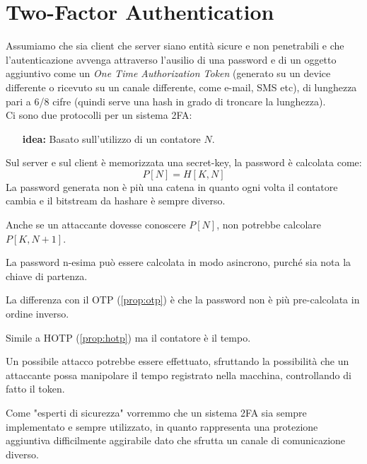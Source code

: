 \section{Two-Factor Authentication}
Assumiamo che sia client che server siano entità sicure e non penetrabili e che l'autenticazione avvenga attraverso l'ausilio di una password e di un oggetto aggiuntivo come un \textit{One Time Authorization Token} (generato su un device differente o ricevuto su un canale differente, come e-mail, SMS etc), di lunghezza pari a 6/8 cifre (quindi serve una hash in grado di troncare la lunghezza).\\
Ci sono due protocolli per un sistema 2FA:
\begin{proposition}\label{prop:hotp}
\begin{itemize}
    \item [\textbf{idea:}]Basato sull'utilizzo di un contatore $N$.
\end{itemize}
Sul server e sul client è memorizzata una secret-key, la password è calcolata come: 
\begin{equation*}
    P[N]=H[K,N]
\end{equation*}
La password generata non è più una catena in quanto ogni volta il contatore cambia e il bitstream da hashare è sempre diverso.
\end{proposition}
\begin{remark}
Anche se un attaccante dovesse conoscere $P[N]$, non potrebbe calcolare $P[K,N+1]$.
\end{remark}
\begin{remark}
La password n-esima può essere calcolata in modo asincrono, purché sia nota la chiave di partenza.
\end{remark}
\begin{remark}
La differenza con il OTP (\cref{prop:otp}) è che la password non è più pre-calcolata in ordine inverso. 
\end{remark}
\begin{proposition}\label{ prop:totp}
Simile a HOTP (\cref{prop:hotp}) ma il contatore è il tempo.
\end{proposition}
\begin{remark}
Un possibile attacco potrebbe essere effettuato, sfruttando la possibilità che un attaccante possa manipolare il tempo registrato nella macchina, controllando di fatto il token.
\end{remark}
\begin{corollary}
Come "esperti di sicurezza" vorremmo che un sistema 2FA sia sempre implementato e sempre utilizzato, in quanto rappresenta una protezione aggiuntiva difficilmente aggirabile dato che sfrutta un canale di comunicazione diverso.
\end{corollary}
